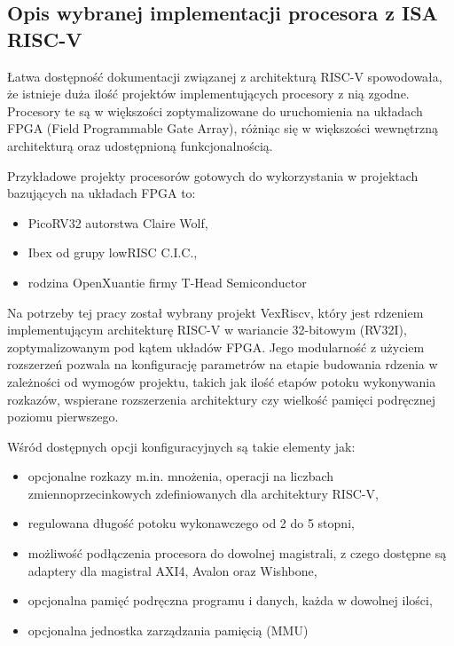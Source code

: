 \subsection{Opis wybranej implementacji procesora z ISA RISC-V}

Łatwa dostępność dokumentacji związanej z architekturą RISC-V spowodowała, że istnieje duża ilość projektów implementujących procesory z nią zgodne. Procesory te są w większości zoptymalizowane do uruchomienia na układach FPGA (Field Programmable Gate Array), różniąc się w większości wewnętrzną architekturą oraz udostępnioną funkcjonalnością.

Przykładowe projekty procesorów gotowych do wykorzystania w projektach bazujących na układach FPGA to:
\begin{itemize}
	\item PicoRV32\cite{picorv32} autorstwa Claire Wolf,
	\item Ibex\cite{ibex} od grupy lowRISC C.I.C.,
	\item rodzina OpenXuantie\cite{openxuantie} firmy T-Head Semiconductor
\end{itemize}

Na potrzeby tej pracy został wybrany projekt VexRiscv\cite{vexriscv:2018:Online}, który jest rdzeniem implementującym architekturę RISC-V\cite{Waterman:EECS-2014-54} w wariancie 32-bitowym (RV32I), zoptymalizowanym pod kątem układów FPGA. Jego modularność z użyciem rozszerzeń pozwala na konfigurację parametrów na etapie budowania rdzenia w zależności od wymogów projektu, takich jak ilość etapów potoku wykonywania rozkazów, wspierane rozszerzenia architektury czy wielkość pamięci podręcznej poziomu pierwszego.

Wśród dostępnych opcji konfiguracyjnych są takie elementy jak:
\begin{itemize}
	\item opcjonalne rozkazy m.in. mnożenia, operacji na liczbach zmiennoprzecinkowych zdefiniowanych dla architektury RISC-V,
	\item regulowana długość potoku wykonawczego od 2 do 5 stopni,
	\item możliwość podłączenia procesora do dowolnej magistrali, z czego dostępne są adaptery dla magistral AXI4, Avalon oraz Wishbone,
	\item opcjonalna pamięć podręczna programu i danych, każda w dowolnej ilości,
	\item opcjonalna jednostka zarządzania pamięcią (MMU)
\end{itemize}

